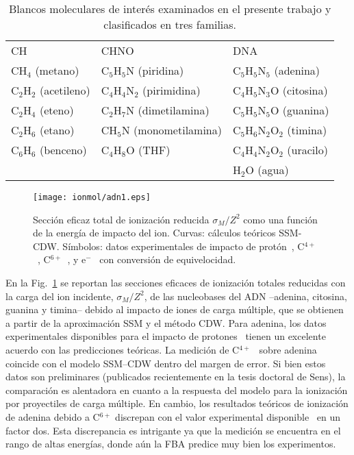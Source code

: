 \begin{table}
\begin{center}
\begin{tabularx}{\textwidth}{
>{\centering\arraybackslash}p{}
>{\centering\arraybackslash}p{}
>{\centering\arraybackslash}p{}}
\rowcolor{mydarkgray} 
CH & CHNO & DNA \\
CH$_4$ (metano) & C$_5$H$_5$N (piridina)       & C$_5$H$_5$N$_5$ (adenina) \\
\rowcolor{mygray} 
C$_2$H$_2$ (acetileno) & C$_4$H$_4$N$_2$ (pirimidina)     & C$_4$H$_5$N$_3$O (citosina) \\
C$_2$H$_4$ (eteno)     & C$_2$H$_7$N     (dimetilamina)   & C$_5$H$_5$N$_5$O (guanina) \\
\rowcolor{mygray} 
C$_2$H$_6$ (etano)     & CH$_5$N         (monometilamina) & C$_5$H$_6$N$_2$O$_2$ (timina) \\
C$_6$H$_6$ (benceno)   & C$_4$H$_8$O     (THF)            & C$_4$H$_4$N$_2$O$_2$ (uracilo) \\
\rowcolor{mygray} 
 & & H$_2$O (agua) \\
\end{tabularx}
\caption[Blancos moleculares examinados y clasificados en tres 
familias.]
{Blancos moleculares de interés examinados en el presente trabajo y 
clasificados en tres familias.}
\label{tab:families}
\end{center}
\end{table}

\begin{figure}
\centering
\texttt{[image: ionmol/adn1.eps]}
\caption[Sección eficaz total de ionización reducida por $Z$ (Parte I).]
{Sección eficaz total de ionización reducida $\sigma_{M}/Z^2$ como 
una función de la energía de impacto del ion. Curvas: cálculos teóricos 
SSM-CDW. Símbolos: datos experimentales de impacto de 
protón~\cite{Iriki:11}, 
C$^{4+}$~\cite{Sens:20}, C$^{6+}$~\cite{Bhattacharjee:19}, y 
e$^-$~\cite{Rahman:16} con conversión de equivelocidad.}
\label{fig:crossDNA_1}
\end{figure} 

En la Fig.~\ref{fig:crossDNA_1} se reportan las secciones eficaces de 
ionización totales reducidas con la carga del ion incidente, 
$\sigma_M/Z^2$, de las nucleobases del ADN --adenina, citosina, guanina 
y timina-- debido al impacto de iones de carga múltiple, que se obtienen 
a partir de la aproximación SSM y el método CDW. Para adenina, los datos 
experimentales disponibles para el impacto de protones~\cite{Iriki:11} 
tienen un excelente acuerdo con las predicciones teóricas. La medición de 
C$^{4+}$~\cite{Sens:20} sobre adenina coincide con el modelo SSM--CDW 
dentro del margen de error. Si bien estos datos son preliminares 
(publicados recientemente en la tesis doctoral de Sens), la comparación 
es alentadora en cuanto a la respuesta del modelo para la ionización por 
proyectiles de carga múltiple. En cambio, los resultados teóricos de 
ionización de adenina debido a C$^{6+}$ discrepan con el valor 
experimental disponible~\cite{Bhattacharjee:19} en un factor dos. Esta 
discrepancia es intrigante ya que la medición se encuentra en el rango 
de altas energías, donde aún la FBA predice muy bien los experimentos.

